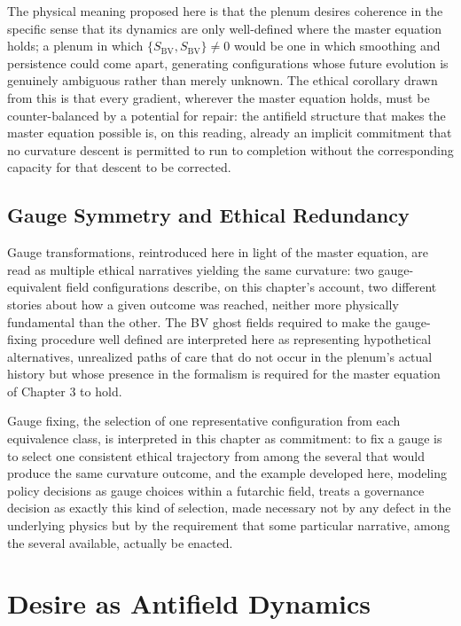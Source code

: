 The physical meaning proposed here is that the plenum desires coherence in the specific sense that its dynamics are only well-defined where the master equation holds; a plenum in which $\{S_{\text{BV}}, S_{\text{BV}}\} \neq 0$ would be one in which smoothing and persistence could come apart, generating configurations whose future evolution is genuinely ambiguous rather than merely unknown. The ethical corollary drawn from this is that every gradient, wherever the master equation holds, must be counter-balanced by a potential for repair: the antifield structure that makes the master equation possible is, on this reading, already an implicit commitment that no curvature descent is permitted to run to completion without the corresponding capacity for that descent to be corrected.

\chapter{Gauge Symmetry and Ethical Redundancy}

Gauge transformations, reintroduced here in light of the master equation, are read as multiple ethical narratives yielding the same curvature: two gauge-equivalent field configurations describe, on this chapter's account, two different stories about how a given outcome was reached, neither more physically fundamental than the other. The BV ghost fields required to make the gauge-fixing procedure well defined are interpreted here as representing hypothetical alternatives, unrealized paths of care that do not occur in the plenum's actual history but whose presence in the formalism is required for the master equation of Chapter 3 to hold.

Gauge fixing, the selection of one representative configuration from each equivalence class, is interpreted in this chapter as commitment: to fix a gauge is to select one consistent ethical trajectory from among the several that would produce the same curvature outcome, and the example developed here, modeling policy decisions as gauge choices within a futarchic field, treats a governance decision as exactly this kind of selection, made necessary not by any defect in the underlying physics but by the requirement that some particular narrative, among the several available, actually be enacted.

\part{Desire as Antifield Dynamics}

